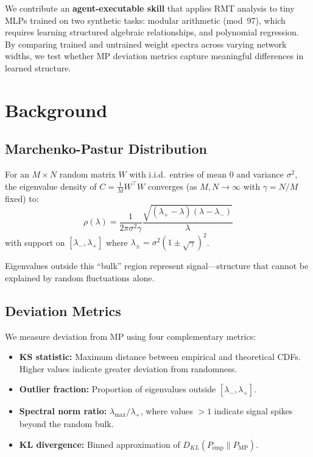 \documentclass[11pt]{article}
\begin{document}
We contribute an \textbf{agent-executable skill} that applies RMT analysis to tiny MLPs trained on two synthetic tasks: modular arithmetic (mod~97), which requires learning structured algebraic relationships, and polynomial regression.
By comparing trained and untrained weight spectra across varying network widths, we test whether MP deviation metrics capture meaningful differences in learned structure.

\section{Background}

\subsection{Marchenko-Pastur Distribution}

For an $M \times N$ random matrix $W$ with i.i.d.\ entries of mean 0 and variance $\sigma^2$, the eigenvalue density of $C = \frac{1}{M}W^\top W$ converges (as $M, N \to \infty$ with $\gamma = N/M$ fixed) to:
\begin{equation}
\rho(\lambda) = \frac{1}{2\pi \sigma^2 \gamma} \frac{\sqrt{(\lambda_+ - \lambda)(\lambda - \lambda_-)}}{\lambda}
\end{equation}
with support on $[\lambda_-, \lambda_+]$ where $\lambda_{\pm} = \sigma^2(1 \pm \sqrt{\gamma})^2$.

Eigenvalues outside this ``bulk'' region represent signal---structure that cannot be explained by random fluctuations alone.

\subsection{Deviation Metrics}

We measure deviation from MP using four complementary metrics:
\begin{itemize}
    \item \textbf{KS statistic:} Maximum distance between empirical and theoretical CDFs. Higher values indicate greater deviation from randomness.
    \item \textbf{Outlier fraction:} Proportion of eigenvalues outside $[\lambda_-, \lambda_+]$.
    \item \textbf{Spectral norm ratio:} $\lambda_{\max} / \lambda_+$, where values $> 1$ indicate signal spikes beyond the random bulk.
    \item \textbf{KL divergence:} Binned approximation of $D_{KL}(P_{\text{emp}} \| P_{\text{MP}})$.
\end{itemize}
\end{document}
